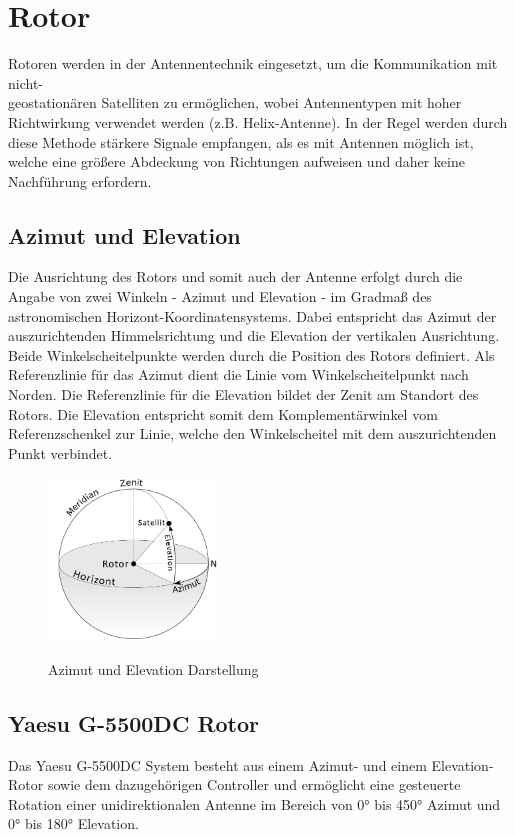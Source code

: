 \chapter{Rotor}
Rotoren werden in der Antennentechnik eingesetzt, um die Kommunikation mit nicht-\\geostationären Satelliten zu ermöglichen, wobei Antennentypen mit hoher Richtwirkung verwendet werden (z.B. Helix-Antenne). In der Regel werden durch diese Methode stärkere Signale empfangen, als es mit Antennen möglich ist, welche eine größere Abdeckung von Richtungen aufweisen und daher keine Nachführung erfordern. 
\section{Azimut und Elevation}
Die Ausrichtung des Rotors und somit auch der Antenne erfolgt durch die Angabe von zwei Winkeln - Azimut und Elevation - im Gradmaß des astronomischen Horizont-Koordinatensystems. Dabei entspricht das Azimut der auszurichtenden Himmelsrichtung und die Elevation der vertikalen Ausrichtung. Beide Winkelscheitelpunkte werden durch die Position des Rotors definiert. Als Referenzlinie für das Azimut dient die Linie vom Winkelscheitelpunkt nach Norden. Die Referenzlinie für die Elevation bildet der Zenit am Standort des Rotors. Die Elevation entspricht somit dem Komplementärwinkel vom Referenzschenkel zur Linie, welche den Winkelscheitel mit dem auszurichtenden Punkt verbindet.\cite{noauthor_astronomische_nodate}

\begin{figure}[H]
	\centering
	\includegraphics[width=4.5cm]{../ref/Azimuth-Altitude_schematic_satellit.png}
	\label{fig:Azimut_Elevation_Schematic}
	\caption{Azimut und Elevation Darstellung \cite{twcarlson_azimuth_2020}}
\end{figure}

\section{Yaesu G-5500DC Rotor}
\label{sec:yaesug5500dc}
Das Yaesu G-5500DC System besteht aus einem Azimut- und einem Elevation-Rotor sowie dem dazugehörigen Controller und ermöglicht eine gesteuerte Rotation einer unidirektionalen Antenne im Bereich von 0° bis 450° Azimut und 0° bis 180° Elevation. \cite{noauthor_yaesu_nodate}

